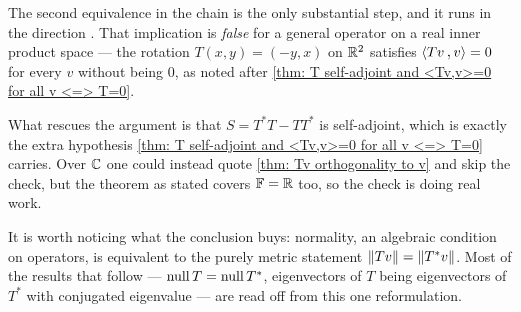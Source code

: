\begin{ainote}
  The second equivalence in the chain is the only substantial step, and it runs in the direction . That implication is \emph{false} for a general operator on a real inner product space --- the rotation $T(x,y) = (-y,x)$ on $\mathbb{R}^2$ satisfies $\ip{Tv}{v} = 0$ for every $v$ without being $0$, as noted after \ref{thm: T self-adjoint and <Tv,v>=0 for all v <=> T=0}.

  What rescues the argument is that $S = T^*T - TT^*$ is self-adjoint, which is exactly the extra hypothesis \ref{thm: T self-adjoint and <Tv,v>=0 for all v <=> T=0} carries. Over $\mathbb{C}$ one could instead quote \ref{thm: Tv orthogonality to v} and skip the check, but the theorem as stated covers $\mathbb{F} = \mathbb{R}$ too, so the check is doing real work.

  It is worth noticing what the conclusion buys: normality, an algebraic condition on operators, is equivalent to the purely metric statement $\left \lVert Tv \right \rVert = \left \lVert T^*v \right \rVert$. Most of the results that follow --- $\operatorname{null} T = \operatorname{null} T^*$, eigenvectors of $T$ being eigenvectors of $T^*$ with conjugated eigenvalue --- are read off from this one reformulation.
\end{ainote}

